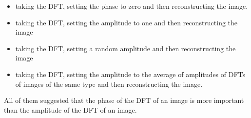  \begin{itemize}
	\item taking the \ac{DFT}, setting the phase to zero and then reconstructing the image\cite{Oppenheim1981}.
	\item taking the \ac{DFT}, setting the amplitude to one and then reconstructing the image\cite{Oppenheim1981}
	\item taking the \ac{DFT}, setting a random amplitude and then reconstructing the image\cite{Oppenheim1981}
	\item taking the \ac{DFT}, setting the amplitude to the average of amplitudes of \ac{DFT}s of images of the same type and then reconstructing the image\cite{Oppenheim1981}.
 \end{itemize} 
 All of them suggested that the phase of the \ac{DFT} of an image 
 is more important than the amplitude of the \ac{DFT} of an image\cite{Oppenheim1979}\cite{Oppenheim1981}.  

